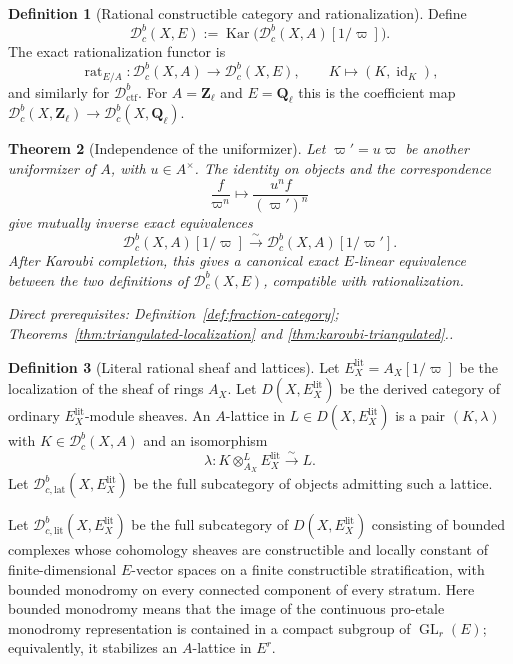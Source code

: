 \documentclass[10pt]{article}
\newtheorem{theorem}{Theorem}[section]
\theoremstyle{definition}
\newtheorem{definition}[theorem]{Definition}
\newcommand{\Zl}{\mathbf Z_\ell}
\newcommand{\Ql}{\mathbf Q_\ell}
\newcommand{\Dbc}{\mathcal D^b_c}
\newcommand{\Dctf}{\mathcal D^b_{\mathrm{ctf}}}
\newcommand{\Dbclat}{\mathcal D^b_{c,\mathrm{lat}}}
\newcommand{\Dbclit}{\mathcal D^b_{c,\mathrm{lit}}}
\newcommand{\Kar}{\operatorname{Kar}}
\newcommand{\depends}[1]{\par\smallskip\noindent\textit{Direct prerequisites:} #1.}
\begin{document}
\begin{definition}[Rational constructible category and rationalization]
\label{def:rational-category}
Define
\[
 \Dbc(X,E):=\Kar\bigl(\Dbc(X,A)[1/\varpi]\bigr).
\]
The exact rationalization functor is
\[
 \operatorname{rat}_{E/A}:\Dbc(X,A)\longrightarrow\Dbc(X,E),
 \qquad K\longmapsto(K,\operatorname{id}_K),
\]
and similarly for $\Dctf$.  For $A=\Zl$ and $E=\Ql$ this is the coefficient
map $\Dbc(X,\Zl)\to\Dbc(X,\Ql)$.
\end{definition}

\begin{theorem}[Independence of the uniformizer]
\label{thm:uniformizer-independence}
Let $\varpi'=u\varpi$ be another uniformizer of $A$, with $u\in A^\times$.
The identity on objects and the correspondence
\[
 \frac{f}{\varpi^n}\longmapsto\frac{u^nf}{(\varpi')^n}
\]
give mutually inverse exact equivalences
\[
 \Dbc(X,A)[1/\varpi]\xrightarrow{\sim}
 \Dbc(X,A)[1/\varpi'].
\]
After Karoubi completion, this gives a canonical exact $E$-linear
equivalence between the two definitions of $\Dbc(X,E)$, compatible with
rationalization.
\depends{Definition~\ref{def:fraction-category};
Theorems~\ref{thm:triangulated-localization} and
\ref{thm:karoubi-triangulated}.}
\end{theorem}

\begin{definition}[Literal rational sheaf and lattices]
\label{def:literal-rational}
Let $E_X^{\mathrm{lit}}=A_X[1/\varpi]$ be the localization of the sheaf of
rings $A_X$.  Let $D(X,E_X^{\mathrm{lit}})$ be the derived category of
ordinary $E_X^{\mathrm{lit}}$-module sheaves.  An $A$-lattice in
$L\in D(X,E_X^{\mathrm{lit}})$ is a pair $(K,\lambda)$ with
$K\in\Dbc(X,A)$ and an isomorphism
\[
 \lambda:K\otimes^L_{A_X}E_X^{\mathrm{lit}}
       \xrightarrow{\sim}L.
\]
Let $\Dbclat(X,E_X^{\mathrm{lit}})$ be the full subcategory of
objects admitting such a lattice.

Let $\Dbclit(X,E_X^{\mathrm{lit}})$ be the full subcategory of
$D(X,E_X^{\mathrm{lit}})$ consisting of bounded complexes whose cohomology
sheaves are constructible and locally constant of finite-dimensional
$E$-vector spaces on a finite constructible stratification, with bounded
monodromy on every connected component of every stratum.  Here bounded
monodromy means that the image of the continuous pro-etale monodromy
representation is contained in a compact subgroup of
$\operatorname{GL}_r(E)$; equivalently, it stabilizes an $A$-lattice in
$E^r$.
\end{definition}
\end{document}
